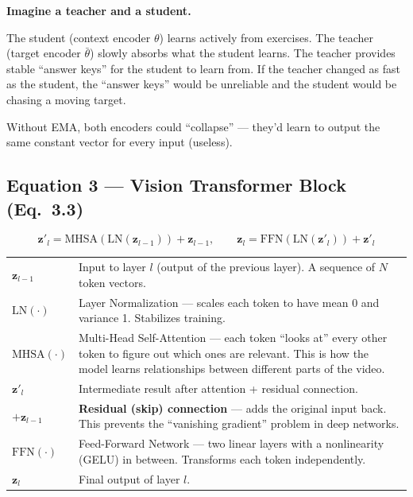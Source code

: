 \documentclass[12pt, a4paper]{article}
\begin{document}
\begin{analogybox}
\textbf{Imagine a teacher and a student.}

The student (context encoder $\theta$) learns actively from exercises. The teacher (target encoder $\bar{\theta}$) slowly absorbs what the student learns. The teacher provides stable ``answer keys'' for the student to learn from. If the teacher changed as fast as the student, the ``answer keys'' would be unreliable and the student would be chasing a moving target.

Without EMA, both encoders could ``collapse'' --- they'd learn to output the same constant vector for every input (useless).
\end{analogybox}


\subsection{Equation 3 --- Vision Transformer Block (Eq.~3.3)}

\begin{eqbox}
\[
\mathbf{z}'_l = \text{MHSA}(\text{LN}(\mathbf{z}_{l-1})) + \mathbf{z}_{l-1}, \qquad
\mathbf{z}_l = \text{FFN}(\text{LN}(\mathbf{z}'_l)) + \mathbf{z}'_l
\]
\end{eqbox}

\begin{explainbox}
\begin{tabular}{lp{11cm}}
$\mathbf{z}_{l-1}$ & Input to layer $l$ (output of the previous layer). A sequence of $N$ token vectors.\\[0.2cm]
$\text{LN}(\cdot)$ & Layer Normalization --- scales each token to have mean 0 and variance 1. Stabilizes training.\\[0.2cm]
$\text{MHSA}(\cdot)$ & Multi-Head Self-Attention --- each token ``looks at'' every other token to figure out which ones are relevant. This is how the model learns relationships between different parts of the video.\\[0.2cm]
$\mathbf{z}'_l$ & Intermediate result after attention + residual connection.\\[0.2cm]
$+ \mathbf{z}_{l-1}$ & \textbf{Residual (skip) connection} --- adds the original input back. This prevents the ``vanishing gradient'' problem in deep networks.\\[0.2cm]
$\text{FFN}(\cdot)$ & Feed-Forward Network --- two linear layers with a nonlinearity (GELU) in between. Transforms each token independently.\\[0.2cm]
$\mathbf{z}_l$ & Final output of layer $l$.
\end{tabular}
\end{explainbox}
\end{document}
